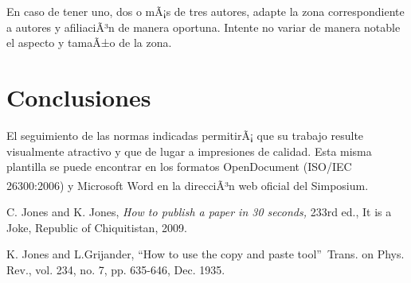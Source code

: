 \documentclass[10pt,conference,a4paper]{IEEEtran}
\begin{document}
En caso de tener uno, dos o mÃ¡s de tres autores, adapte la zona
correspondiente a autores y afiliaciÃ³n de manera oportuna. Intente no variar
de manera notable el aspecto y tamaÃ±o de la zona.

\section{Conclusiones}

El seguimiento de las normas indicadas permitirÃ¡ que su trabajo resulte
visualmente atractivo y que de lugar a impresiones de calidad. Esta misma
plantilla se puede encontrar en los formatos OpenDocument (ISO/IEC 26300:2006)
y Microsoft Word\textsuperscript{\textregistered} en la direcciÃ³n web oficial del Simposium.


\begin{thebibliography}{9}                                                                                                %
    C. Jones and K. Jones, \emph{How to publish a paper in 30
seconds,} 233rd ed., It is a Joke, Republic of Chiquitistan, 2009.

    K. Jones and L.Grijander, \textquotedblleft How to use
the copy and paste tool\textquotedblright\ Trans. on Phys. Rev., vol. 234, no.
7, pp. 635-646, Dec. 1935.
\end{thebibliography}
\end{document}
